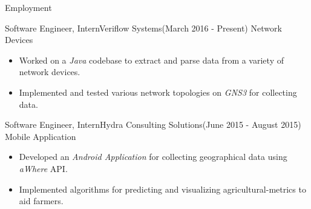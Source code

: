 \documentclass[]{Gohar_CV_Jobs}
\begin{document}
    \makeheader
    
    \begin{cvsection}{Employment}
        \begin{cvsubsection}{Software Engineer, Intern}{Veriflow Systems}{{\normalfont (March 2016 - Present)}}
            Network Devices
            \begin{itemize}
                \item Worked on a \textit{Java} codebase to extract and parse data from a variety of network devices.
                \item Implemented and tested various network topologies on \textit{GNS3} for collecting data.
            \end{itemize}
        \end{cvsubsection}
        \begin{cvsubsection}{Software Engineer, Intern}{Hydra Consulting Solutions}{{\normalfont (June 2015 - August 2015)}}
            Mobile Application
            \begin{itemize}
                \item Developed an \textit{Android Application} for collecting geographical data using \textit{aWhere} API.
                \item Implemented algorithms for predicting and visualizing agricultural-metrics to aid farmers.
            \end{itemize}
        \end{cvsubsection}
    \end{cvsection}
\end{document}

